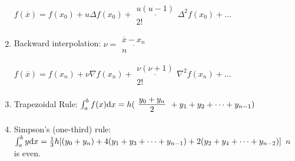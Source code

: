 \documentclass[a4paper]{article}
\begin{document}
\begin{enumerate}
$f(\overline{x}) = f(x_0) + u \Delta f(x_0) +
\begin{array}{c}
\underline{u(u-1)} \\
2!
\end{array}
\Delta^2f(x_0) + \dots$

\item Backward interpolation:
$\nu=
\begin{array}{c}
\underline{\overline{x} - x_n} \\
n
\end{array}$

$f(\overline{x}) = f(x_n) + \nu \nabla f(x_n) +
\begin{array}{c}
\underline{\nu(\nu+1)} \\
2!
\end{array}
\nabla^2f(x_n) + \dots$

\item Trapezoidal Rule:
$\int_a^b f(x) \mathrm{d} x = h(
\begin{array}{c}
\underline{y_0+y_n} \\
2
\end{array}
+y_1+y_2+\dots+y_{n-1})$

\item Simpson's (one-third) rule:
$\int_a^b y \mathrm{d} x=\frac{1}{3} h [(y_0 + y_n) + 4(y_1 + y_3 + \dots + y_{n-1})
+2(y_2 + y_4 + \dots + y_{n-2})]$
$n$ is even.


\end{enumerate}
\end{document}

